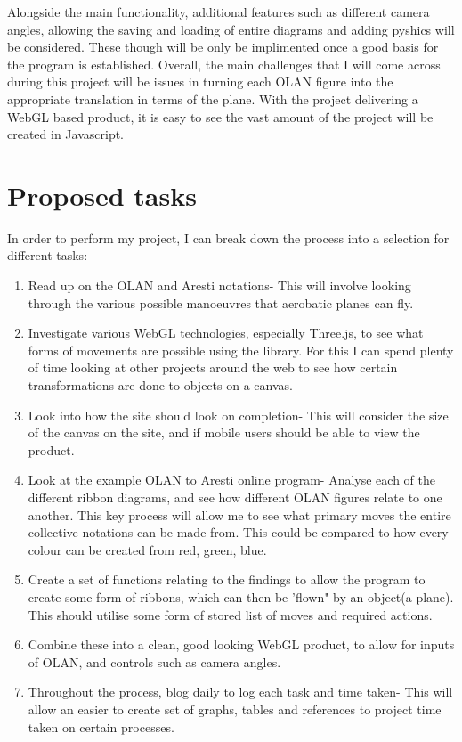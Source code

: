 \documentclass[11pt,fleqn,twoside]{article}
\begin{document}
Alongside the main functionality, additional features such as different camera angles, allowing the saving and loading of entire diagrams and adding pyshics will be considered. These though will be only be implimented once a good basis for the program is established. Overall, the main challenges that I will come across during this project will be issues in turning each OLAN figure into the appropriate translation in terms of the plane. With the project delivering a WebGL based product, it is easy to see the vast amount of the project will be created in Javascript.

\section{Proposed tasks}
In order to perform my project, I can break down the process into a selection for different tasks:
\begin{enumerate}
\item Read up on the OLAN and Aresti notations- This will involve looking through the various possible manoeuvres that aerobatic planes can fly.
\item Investigate various WebGL technologies, especially Three.js, to see what forms of movements are possible using the library. For this I can spend plenty of time looking at other projects around the web to see how certain transformations are done to objects on a canvas.
\item Look into how the site should look on completion- This will consider the size of the canvas on the site, and if mobile users should be able to view the product.
\item Look at the example OLAN to Aresti online program- Analyse each of the different ribbon diagrams, and see how different OLAN figures relate to one another. This key process will allow me to see what primary moves the entire collective notations can be made from. This could be compared to how every colour can be created from red, green, blue.
\item Create a set of functions relating to the findings to allow the program to create some form of ribbons, which can then be 'flown" by an object(a plane). This should utilise some form of stored list of moves and required actions.
\item Combine these into a clean, good looking WebGL product, to allow for inputs of OLAN, and controls such as camera angles.
\item Throughout the process, blog daily to log each task and time taken- This will allow an easier to create set of graphs, tables and references to project time taken on certain processes.
\end{enumerate}
\end{document}
